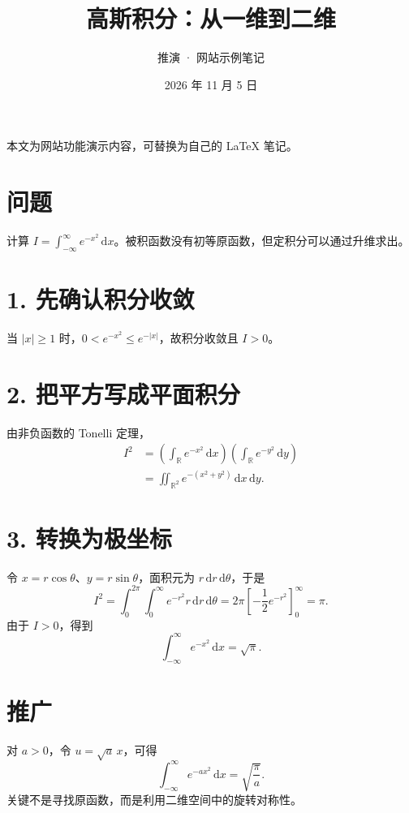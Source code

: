 \documentclass[11pt,a4paper,fontset=fandol]{ctexart}
\title{\color{forest}高斯积分：从一维到二维}
\author{推演 · 网站示例笔记}
\date{2026 年 11 月 5 日}
\begin{document}
\maketitle
\begin{center}\small 本文为网站功能演示内容，可替换为自己的 LaTeX 笔记。\end{center}
\section*{问题}
计算 $I=\int_{-\infty}^{\infty}e^{-x^2}\,\mathrm{d}x$。被积函数没有初等原函数，但定积分可以通过升维求出。
\section*{1. 先确认积分收敛}
当 $|x|\ge 1$ 时，$0<e^{-x^2}\le e^{-|x|}$，故积分收敛且 $I>0$。
\section*{2. 把平方写成平面积分}
由非负函数的 Tonelli 定理，
\begin{align*}
I^2&=\left(\int_{\mathbb R}e^{-x^2}\,\mathrm{d}x\right)
\left(\int_{\mathbb R}e^{-y^2}\,\mathrm{d}y\right)\\
&=\iint_{\mathbb R^2}e^{-(x^2+y^2)}\,\mathrm{d}x\,\mathrm{d}y.
\end{align*}
\section*{3. 转换为极坐标}
令 $x=r\cos\theta$、$y=r\sin\theta$，面积元为 $r\,\mathrm{d}r\,\mathrm{d}\theta$，于是
\[
I^2=\int_0^{2\pi}\int_0^\infty e^{-r^2}r\,\mathrm{d}r\,\mathrm{d}\theta
=2\pi\left[-\frac12e^{-r^2}\right]_0^\infty=\pi.
\]
由于 $I>0$，得到
\[\boxed{\displaystyle\int_{-\infty}^{\infty} e^{-x^2}\,\mathrm{d}x=\sqrt{\pi}.}\]
\section*{推广}
对 $a>0$，令 $u=\sqrt a\,x$，可得
\[
\int_{-\infty}^{\infty}e^{-ax^2}\,\mathrm{d}x=\sqrt{\frac\pi a}.
\]
关键不是寻找原函数，而是利用二维空间中的旋转对称性。
\end{document}
